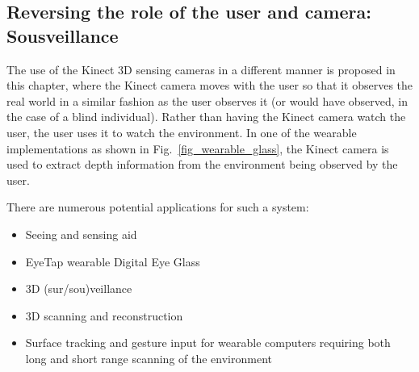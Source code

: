 \subsection{Reversing the role of the user and camera: Sousveillance}
The use of the Kinect 3D sensing cameras in a different manner is proposed in this chapter, where the Kinect camera moves with the user so that it observes the real world in a similar fashion as the user observes it (or would have observed, in the case of a blind individual). Rather than having the Kinect camera watch the user, the user uses it to watch the environment. In one of the wearable implementations as shown in Fig.~\ref{fig_wearable_glass}, the Kinect camera is used to extract depth information from the environment being observed by the user.

There are numerous potential applications for such a system:
\begin{itemize}
\item Seeing and sensing aid~\cite{mann2011blind}
\item EyeTap wearable Digital Eye Glass~\cite{lo2012high, mann2012hdrchitecture, mann2012realtime}
\item 3D (sur/sou)veillance 
\item 3D scanning and reconstruction~\cite{izadi2011kinectfusion}
\item Surface tracking and gesture input for wearable computers requiring both long and short range scanning of the environment~\cite{newcombe2011kinectfusion}
\end{itemize}


